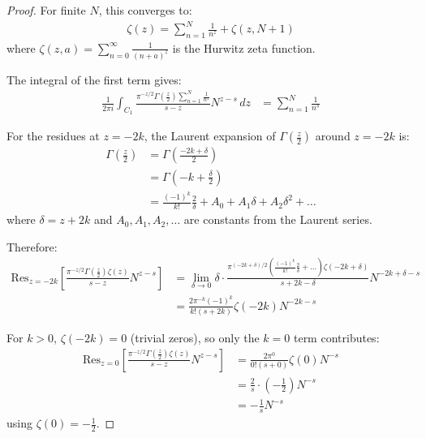 \documentclass{article}
\begin{document}
\begin{proof}
For finite $N$, this converges to:
\begin{align}\label{eq:dirichlet_finite}
\zeta(z) = \sum_{n=1}^{N}\frac{1}{n^z} + \zeta(z,N+1)
\end{align}
where $\zeta(z,a) = \sum_{n=0}^{\infty}\frac{1}{(n+a)^z}$ is the Hurwitz zeta function.

The integral of the first term gives:
\begin{align}\label{eq:dirichlet_integral}
\frac{1}{2\pi i}\int_{C_1} \frac{\pi^{-z/2}\Gamma\left(\frac{z}{2}\right)\sum_{n=1}^{N}\frac{1}{n^z}}{s-z}N^{z-s}\,dz &= \sum_{n=1}^{N}\frac{1}{n^s}
\end{align}

For the residues at $z=-2k$, the Laurent expansion of $\Gamma\left(\frac{z}{2}\right)$ around $z=-2k$ is:
\begin{align}
\Gamma\left(\frac{z}{2}\right) &= \Gamma\left(\frac{-2k+\delta}{2}\right) \label{eq:gamma_laurent1}\\
&= \Gamma\left(-k+\frac{\delta}{2}\right) \label{eq:gamma_laurent2}\\
&= \frac{(-1)^k}{k!}\frac{2}{\delta} + A_0 + A_1\delta + A_2\delta^2 + \ldots \label{eq:gamma_laurent3}
\end{align}
where $\delta = z+2k$ and $A_0, A_1, A_2, \ldots$ are constants from the Laurent series.

Therefore:
\begin{align}
\text{Res}_{z=-2k}\left[\frac{\pi^{-z/2}\Gamma\left(\frac{z}{2}\right)\zeta(z)}{s-z}N^{z-s}\right] &= \lim_{\delta\to 0}\delta\cdot\frac{\pi^{(-2k+\delta)/2}\left(\frac{(-1)^k}{k!}\frac{2}{\delta} + \ldots\right)\zeta(-2k+\delta)}{s+2k-\delta}N^{-2k+\delta-s} \label{eq:residue_neg1}\\
&= \frac{2\pi^{-k}(-1)^k}{k!(s+2k)}\zeta(-2k)N^{-2k-s} \label{eq:residue_neg2}
\end{align}

For $k>0$, $\zeta(-2k)=0$ (trivial zeros), so only the $k=0$ term contributes:
\begin{align}
\text{Res}_{z=0}\left[\frac{\pi^{-z/2}\Gamma\left(\frac{z}{2}\right)\zeta(z)}{s-z}N^{z-s}\right] &= \frac{2\pi^0}{0!(s+0)}\zeta(0)N^{-s} \label{eq:residue_zero1}\\
&= \frac{2}{s}\cdot\left(-\frac{1}{2}\right)N^{-s} \label{eq:residue_zero2}\\
&= -\frac{1}{s}N^{-s} \label{eq:residue_zero3}
\end{align}
using $\zeta(0)=-\frac{1}{2}$.


\end{proof}
\end{document}
